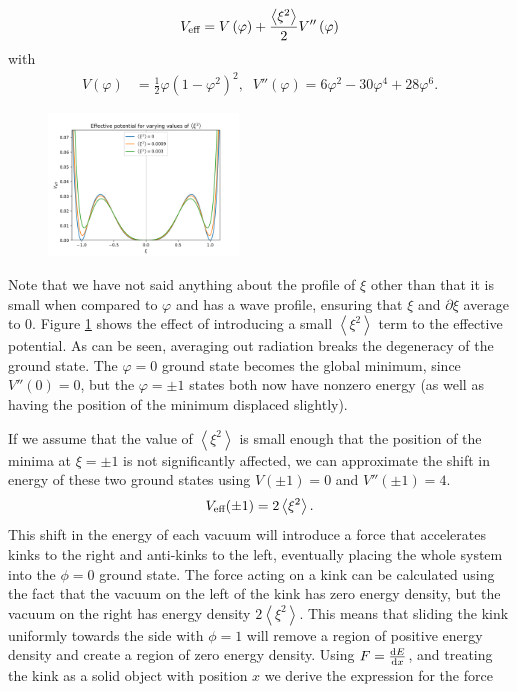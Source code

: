\documentclass[11pt, oneside]{article}  	%
\numberwithin{equation}{section}
\newcommand{\drv}{\ensuremath{\textup{d}}}
\begin{document}
\begin{equation}
V_\textup{eff} = V\left ( \varphi \right ) + \frac{\left \langle \xi^2 \right \rangle}{2}V''\left ( \varphi \right ) 
\end{equation}
with
\begin{align}
V(\varphi) &= \frac{1}{2} \varphi \left ( 1- \varphi^2 \right )^2, \; \;V''(\varphi) = 6\varphi^2 - 30\varphi^4 + 28\varphi^6.
\end{align}
\begin{figure}
\centering
 \includegraphics[width=0.45\textwidth]{potential_averaged.png}
  \label{potential_averaged}
\end{figure}
Note that we have not said anything about the profile of $\xi$ other than that it is small when compared to $\varphi$ and has a wave profile, ensuring that $\xi$ and $\partial \xi$ average to 0. Figure \ref{potential_averaged} shows the effect of introducing a small $\left \langle \xi^2 \right \rangle$ term to the effective potential. As can be seen, averaging out radiation breaks the degeneracy of the ground state. The $\varphi = 0$ ground state becomes the global minimum, since $V''(0) = 0$, but the $\varphi = \pm1$ states both now have nonzero energy (as well as having the position of the minimum displaced slightly).\par
If we assume that the value of $\left \langle \xi^2 \right \rangle$ is small enough that the position of the minima at $\xi = \pm 1$ is not significantly affected, we can approximate the shift in energy of these two ground states using $V(\pm1) = 0$ and $V''(\pm 1) = 4 $.
\begin{equation}
V_{\textup{eff}}(\pm1) = 2 \left \langle \xi^2 \right \rangle.
\end{equation}
This shift in the energy of each vacuum will introduce a force that accelerates kinks to the right and anti-kinks to the left, eventually placing the whole system into the $\phi = 0$ ground state. The force acting on a kink can be calculated using the fact that the vacuum on the left of the kink has zero energy density, but the vacuum on the right has energy density $2 \left \langle \xi^2 \right \rangle$. This means that sliding the kink uniformly towards the side with $\phi = 1$ will remove a region of positive energy density and create a region of zero energy density. Using $F = \frac{\drv E}{\drv x}$, and treating the kink as a solid object with position $x$ we derive the expression for the force
\end{document}
